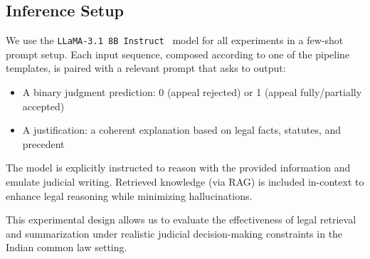 \subsection{Inference Setup}
\label{subsec:inference}
We use the \texttt{LLaMA-3.1 8B Instruct}~\cite{dubey2024llama} model for all experiments in a few-shot prompt setup. Each input sequence, composed according to one of the pipeline templates, is paired with a relevant prompt that asks to output:

\begin{itemize}
    \item A binary judgment prediction: {0} (appeal rejected) or {1} (appeal fully/partially accepted)
    \item A justification: a coherent explanation based on legal facts, statutes, and precedent
\end{itemize}

The model is explicitly instructed to reason with the provided information and emulate judicial writing. Retrieved knowledge (via RAG) is included in-context to enhance legal reasoning while minimizing hallucinations.

This experimental design allows us to evaluate the effectiveness of legal retrieval and summarization under realistic judicial decision-making constraints in the Indian common law setting.




























